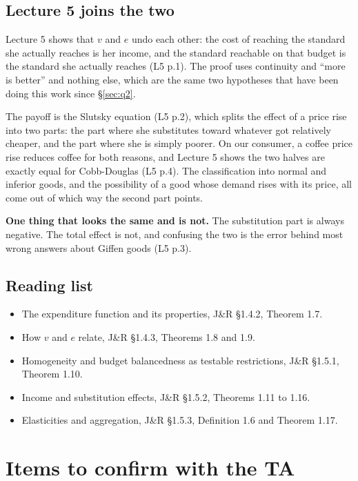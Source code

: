 \documentclass[11pt,letterpaper]{article}
\theoremstyle{definition}
\theoremstyle{plain}
\newcommand{\src}[1]{{\small\textsf{(#1)}}}
\begin{document}
\subsection{Lecture 5 joins the two}

Lecture 5 shows that $v$ and $e$ undo each other: the cost of reaching the standard she actually
reaches is her income, and the standard reachable on that budget is the standard she actually
reaches \src{L5 p.1}. The proof uses continuity and ``more is better'' and nothing else, which are
the same two hypotheses that have been doing this work since \S\ref{sec:q2}.

The payoff is the Slutsky equation \src{L5 p.2}, which splits the effect of a price rise into two
parts: the part where she substitutes toward whatever got relatively cheaper, and the part where she
is simply poorer. On our consumer, a coffee price rise reduces coffee for both reasons, and Lecture 5
shows the two halves are exactly equal for Cobb-Douglas \src{L5 p.4}. The classification into normal
and inferior goods, and the possibility of a good whose demand rises with its price, all come out of
which way the second part points.

\textbf{One thing that looks the same and is not.} The substitution part is always negative. The
total effect is not, and confusing the two is the error behind most wrong answers about Giffen goods
\src{L5 p.3}.

\subsection{Reading list}

\begin{itemize}
\item The expenditure function and its properties, J\&R \S1.4.2, Theorem 1.7.
\item How $v$ and $e$ relate, J\&R \S1.4.3, Theorems 1.8 and 1.9.
\item Homogeneity and budget balancedness as testable restrictions, J\&R \S1.5.1, Theorem 1.10.
\item Income and substitution effects, J\&R \S1.5.2, Theorems 1.11 to 1.16.
\item Elasticities and aggregation, J\&R \S1.5.3, Definition 1.6 and Theorem 1.17.
\end{itemize}

\section{Items to confirm with the TA}
\end{document}
